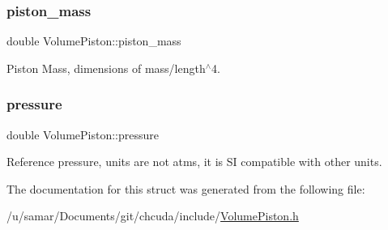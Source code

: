 \subsubsection{\texorpdfstring{piston\+\_\+mass}{piston\_mass}}
{\footnotesize\ttfamily double Volume\+Piston\+::piston\+\_\+mass}



Piston Mass, dimensions of mass/length$^\wedge$4. 

\hypertarget{structVolumePiston_aff364bf76db0d8e73d251dccf2301193}{}\label{structVolumePiston_aff364bf76db0d8e73d251dccf2301193} 
\subsubsection{\texorpdfstring{pressure}{pressure}}
{\footnotesize\ttfamily double Volume\+Piston\+::pressure}



Reference pressure, units are not atms, it is SI compatible with other units. 



The documentation for this struct was generated from the following file\+:\begin{DoxyCompactItemize}
\item 
/u/samar/\+Documents/git/chcuda/include/\hyperlink{VolumePiston_8h}{Volume\+Piston.\+h}\end{DoxyCompactItemize}
